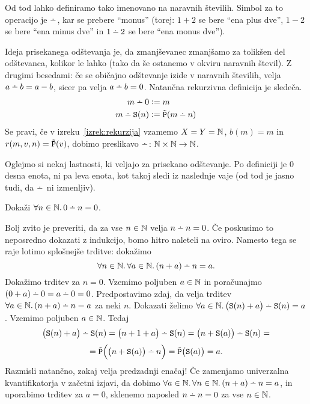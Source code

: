 Od tod lahko definiramo tako imenovano  na naravnih številih. Simbol za to operacijo je $\monus$, kar se prebere ``monus'' (torej: $1 + 2$ se bere ``ena plus dve'', $1 - 2$ se bere ``ena minus dve'' in $1 \monus 2$ se bere ``ena monus dve'').

Ideja prisekanega odštevanja je, da zmanjševanec zmanjšamo za tolikšen del odštevanca, kolikor le lahko (tako da še ostanemo v okviru naravnih števil). Z drugimi besedami: če se običajno odštevanje izide v naravnih številih, velja $a \monus b = a - b$, sicer pa velja $a \monus b = 0$. Natančna rekurzivna definicija je sledeča.
\begin{align*}
m \monus 0 &\dfeq m \\
m \monus \suc(n) &\dfeq \tprd(m \monus n)
\end{align*}
Se pravi, če v izreku~\ref{izrek:rekurzija} vzamemo $X = Y = \mathbb{N}$, $b(m) = m$ in $r(m, v, n) = \tilde{\mathtt{P}}(v)$, dobimo preslikavo $\monus\colon \NN \times \NN \to \NN$.


Oglejmo si nekaj lastnosti, ki veljajo za prisekano odštevanje. Po definiciji je $0$ desna enota, ni pa leva enota, kot takoj sledi iz naslednje vaje (od tod je jasno tudi, da $\monus$ ni izmenljiv).

\begin{vaja}
Dokaži $\all{n \in \NN}{0 \monus n = 0}$.
\end{vaja}

Bolj zvito je preveriti, da za vse $n \in \mathbb{N}$ velja $n \monus n = 0$. Če poskusimo to neposredno dokazati z indukcijo, bomo hitro naleteli na oviro. Namesto tega se raje lotimo splošnejše trditve: dokažimo
\[\all{n \in \NN}\all{a \in \NN}{(n + a) \monus n = a}.\]
Dokažimo trditev za $n = 0$. Vzemimo poljuben $a \in \mathbb{N}$ in poračunajmo $(0 + a) \monus 0 = a \monus 0 = 0$. Predpostavimo zdaj, da velja trditev $\all{a \in \NN}{(n + a) \monus n = a}$ za neki $n$. Dokazati želimo $\all{a \in \NN}{\big(\suc(n) + a\big) \monus \suc(n) = a}$. Vzemimo poljuben $a \in \mathbb{N}$. Tedaj
\[\big(\suc(n) + a\big) \monus \suc(n) = \big(n + 1 + a\big) \monus \suc(n) = \big(n + \suc(a)\big) \monus \suc(n) =\]
\[= \tprd\Big(\big(n + \suc(a)\big) \monus n\Big) = \tprd\big(\suc(a)\big) = a.\]
Razmisli natančno, zakaj velja predzadnji enačaj! Če zamenjamo univerzalna kvantifikatorja v začetni izjavi, da dobimo $\all{a \in \NN}\all{n \in \NN}{(n + a) \monus n = a}$, in uporabimo trditev za $a = 0$, sklenemo naposled $n \monus n = 0$ za vse $n \in \mathbb{N}$.


